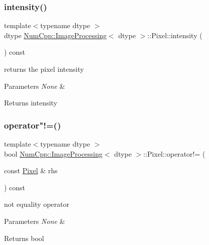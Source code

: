 \subsubsection{\texorpdfstring{intensity()}{intensity()}}
{\footnotesize\ttfamily template$<$typename dtype $>$ \\
dtype \mbox{\hyperlink{class_num_cpp_1_1_image_processing}{Num\+Cpp\+::\+Image\+Processing}}$<$ dtype $>$\+::Pixel\+::intensity (\begin{DoxyParamCaption}{ }\end{DoxyParamCaption}) const\hspace{0.3cm}{\ttfamily [inline]}}

returns the pixel intensity


\begin{DoxyParams}{Parameters}
{\em None} & \\
\hline
\end{DoxyParams}
\begin{DoxyReturn}{Returns}
intensity 
\end{DoxyReturn}
\mbox{\label{class_num_cpp_1_1_image_processing_1_1_pixel_a9d963978a04c7289bd2594981ee7b0f4}} 
\subsubsection{\texorpdfstring{operator"!=()}{operator!=()}}
{\footnotesize\ttfamily template$<$typename dtype $>$ \\
bool \mbox{\hyperlink{class_num_cpp_1_1_image_processing}{Num\+Cpp\+::\+Image\+Processing}}$<$ dtype $>$\+::Pixel\+::operator!= (\begin{DoxyParamCaption}\item[{const \mbox{\hyperlink{class_num_cpp_1_1_image_processing_1_1_pixel}{Pixel}} \&}]{rhs }\end{DoxyParamCaption}) const\hspace{0.3cm}{\ttfamily [inline]}}

not equality operator


\begin{DoxyParams}{Parameters}
{\em None} & \\
\hline
\end{DoxyParams}
\begin{DoxyReturn}{Returns}
bool 
\end{DoxyReturn}
\mbox{\label{class_num_cpp_1_1_image_processing_1_1_pixel_a4ffbcd1bcb81809d257e98156ed9597e}} 
